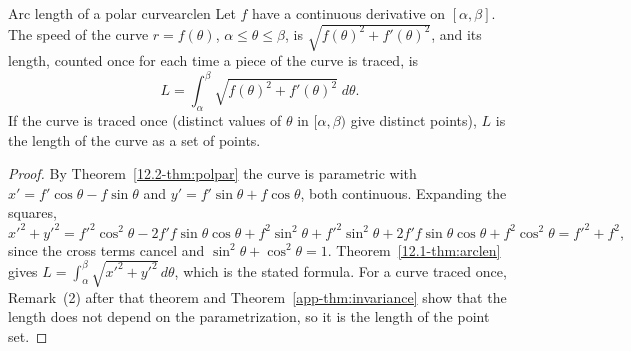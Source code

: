 \documentclass[11pt]{article}
\begin{document}
\begin{thm}{Arc length of a polar curve}{arclen}
Let $f$ have a continuous derivative on $[\alpha,\beta]$. The speed of the curve $r=f(\theta)$, $\alpha\le\theta\le\beta$, is $\sqrt{f(\theta)^2+f'(\theta)^2}$, and its length, counted once for each time a piece of the curve is traced, is
\[
L=\int_\alpha^\beta\sqrt{f(\theta)^2+f'(\theta)^2}\;d\theta .
\]
If the curve is traced once (distinct values of $\theta$ in $[\alpha,\beta)$ give distinct points), $L$ is the length of the curve as a set of points.
\end{thm}
\begin{proof}
By Theorem~\ref{12.2-thm:polpar} the curve is parametric with $x'=f'\cos\theta-f\sin\theta$ and $y'=f'\sin\theta+f\cos\theta$, both continuous. Expanding the squares,
\[
x'^2+y'^2=f'^2\cos^2\theta-2f'f\sin\theta\cos\theta+f^2\sin^2\theta+f'^2\sin^2\theta+2f'f\sin\theta\cos\theta+f^2\cos^2\theta=f'^2+f^2,
\]
since the cross terms cancel and $\sin^2\theta+\cos^2\theta=1$. Theorem~\ref{12.1-thm:arclen} gives $L=\int_\alpha^\beta\sqrt{x'^2+y'^2}\,d\theta$, which is the stated formula. For a curve traced once, Remark~(2) after that theorem and Theorem~\ref{app-thm:invariance} show that the length does not depend on the parametrization, so it is the length of the point set.
\end{proof}
\end{document}

